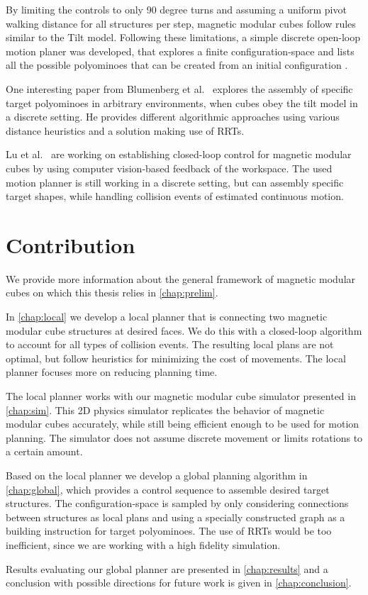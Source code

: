 By limiting the controls to only 90 degree turns and assuming a uniform pivot walking distance for all structures per step, magnetic modular cubes follow rules similar to the Tilt model.
Following these limitations, a simple discrete open-loop motion planer was developed, that explores a finite configuration-space and lists all the possible polyominoes that can be created from an initial configuration \cite{Bhattacharjee2022}.

One interesting paper from Blumenberg et al.\ \cite{blumenberg2023} explores the assembly of specific target polyominoes in arbitrary environments, when cubes obey the tilt model in a discrete setting.
He provides different algorithmic approaches using various distance heuristics and a solution making use of RRTs.

Lu et al.\ \cite{Lu2023} are working on establishing closed-loop control for magnetic modular cubes by using computer vision-based feedback of the workspace.
The used motion planner is still working in a discrete setting, but can assembly specific target shapes, while handling collision events of estimated continuous motion.


\section{Contribution}

We provide more information about the general framework of magnetic modular cubes on which this thesis relies in \autoref{chap:prelim}.

In \autoref{chap:local} we develop a local planner that is connecting two magnetic modular cube structures at desired faces.
We do this with a closed-loop algorithm to account for all types of collision events.
The resulting local plans are not optimal, but follow heuristics for minimizing the cost of movements.
The local planner focuses more on reducing planning time. 

The local planner works with our magnetic modular cube simulator presented in \autoref{chap:sim}.
This 2D physics simulator replicates the behavior of magnetic modular cubes accurately, while still being efficient enough to be used for motion planning.
The simulator does not assume discrete movement or limits rotations to a certain amount.

Based on the local planner we develop a global planning algorithm in \autoref{chap:global}, which provides a control sequence to assemble desired target structures.
The configuration-space is sampled by only considering connections between structures as local plans and using a specially constructed graph as a building instruction for target polyominoes.
The use of RRTs would be too inefficient, since we are working with a high fidelity simulation. 

Results evaluating our global planner are presented in \autoref{chap:results} and a conclusion with possible directions for future work is given in \autoref{chap:conclusion}.